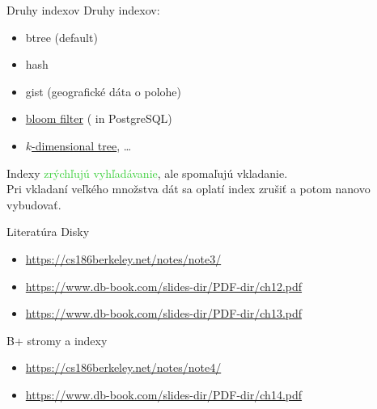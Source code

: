 \documentclass[12pt]{beamer}
\def\green#1{\textcolor{LimeGreen}{#1}}
\begin{document}
\begin{frame}[fragile]{Druhy indexov}
Druhy indexov:
\begin{itemize}
  \item btree (default)
  \item hash
  \item gist (geografické dáta o polohe)
  \item \href{https://brilliant.org/wiki/bloom-filter/#:~:text=A%20bloom%20filter%20is%20a,is%20added%20to%20the%20set.}{bloom filter} (\uv{user-installed} in PostgreSQL)
  \item \href{https://en.wikipedia.org/wiki/K-d_tree}{$k$-dimensional tree}, \dots
\end{itemize}
\bigskip

Indexy \green{zrýchľujú vyhľadávanie}, ale \alert{spomaľujú vkladanie}.\\
Pri vkladaní veľkého množstva dát sa oplatí index zrušiť a potom nanovo vybudovať.
\end{frame}


\begin{frame}{Literatúra}
Disky
\begin{itemize}
\item {\scriptsize\url{https://cs186berkeley.net/notes/note3/}}
\item {\scriptsize\url{https://www.db-book.com/slides-dir/PDF-dir/ch12.pdf}}
\item {\scriptsize\url{https://www.db-book.com/slides-dir/PDF-dir/ch13.pdf}}
\end{itemize}
\bigskip

B+ stromy a indexy
\begin{itemize}
\item {\scriptsize\url{https://cs186berkeley.net/notes/note4/}}
\item {\scriptsize\url{https://www.db-book.com/slides-dir/PDF-dir/ch14.pdf}}
\end{itemize}
\end{frame}
\end{document}
